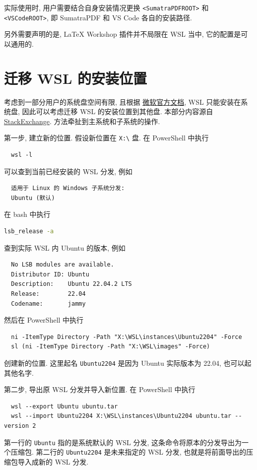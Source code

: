 实际使用时,
用户需要结合自身安装情况更换 \texttt{<SumatraPDFROOT>} 和 \texttt{<VSCodeROOT>},
即 SumatraPDF 和 VS Code 各自的安装路径.

另外需要声明的是,
\LaTeX{} Workshop 插件并不局限在 WSL 当中,
它的配置是可以通用的.

\section{迁移 WSL 的安装位置}

考虑到一部分用户的系统盘空间有限,
且根据%
\href{https://learn.microsoft.com/zh-cn/windows/wsl/troubleshooting?source=recommendations#installation-issues}{微软官方文档},
WSL 只能安装在系统盘,
因此可以考虑迁移 WSL 的安装位置到其他盘.
本部分内容源自
\href{https://superuser.com/questions/1701175/installing-ubuntu-on-mnt-d-with-wsl}{StackExchange}.
方法牵扯到主系统和子系统的操作.

第一步,
建立新的位置.
假设新位置在 \texttt{X:\textbackslash} 盘.
在 \textsf{PowerShell} 中执行
\begin{lstlisting}
  wsl -l
\end{lstlisting}
可以查到当前已经安装的 WSL 分发,
例如
\begin{lstlisting}
  适用于 Linux 的 Windows 子系统分发:
  Ubuntu (默认)
\end{lstlisting}
在 \textsf{bash} 中执行
\begin{lstlisting}[language=bash]
  lsb_release -a
\end{lstlisting}
查到实际 WSL 内 Ubuntu 的版本,
例如
\begin{lstlisting}
  No LSB modules are available.
  Distributor ID: Ubuntu
  Description:    Ubuntu 22.04.2 LTS
  Release:        22.04
  Codename:       jammy
\end{lstlisting}
然后在 \textsf{PowerShell} 中执行
\begin{lstlisting}
  ni -ItemType Directory -Path "X:\WSL\instances\Ubuntu2204" -Force
  sl (ni -ItemType Directory -Path "X:\WSL\images" -Force)
\end{lstlisting}
创建新的位置.
这里起名 \texttt{Ubuntu2204} 是因为 Ubuntu 实际版本为 22.04,
也可以起其他名字.

第二步,
导出原 WSL 分发并导入新位置.
在 \textsf{PowerShell} 中执行
\begin{lstlisting}
  wsl --export Ubuntu ubuntu.tar
  wsl --import Ubuntu2204 X:\WSL\instances\Ubuntu2204 ubuntu.tar --version 2
\end{lstlisting}
第一行的 \texttt{Ubuntu} 指的是系统默认的 WSL 分发,
这条命令将原本的分发导出为一个压缩包.
第二行的 \texttt{Ubuntu2204} 是未来指定的 WSL 分发,
也就是将前面导出的压缩包导入成新的 WSL 分发.

